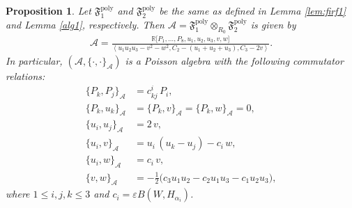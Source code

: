 \documentclass[11pt]{amsart}
\newtheorem{proposition}[theorem]{Proposition}
\theoremstyle{definition}
\theoremstyle{plain}
\theoremstyle{conclusion}
\begin{document}
\begin{proposition}
\label{prop:uniona}
  Let $\mathfrak{F}_1^{\mathrm{poly}}$ and $\mathfrak{F}_2^{\mathrm{poly}}$ be the same as defined in Lemma \ref{lem:firf1} and Lemma \ref{alg1}, respectively. Then $\mathcal{A} = \mathfrak{F}_1^{\mathrm{poly}} \otimes_{R_0} \mathfrak{F}_2^{\mathrm{poly}}$ is given by \begin{align}
    \mathcal{A} =  \frac{\mathbb{R} \bigl[P_1,\ldots,P_8,u_1,u_2,u_3,v,w\bigr]}{\left\langle u_1u_2u_3-v^2-w^2,C_2 - \left(u_1 +  u_2 +  u_3\right) , C_3 - 2 v\right\rangle}     . \label{eq:A1}
\end{align}   In particular, $(\mathcal{A},\{\cdot,\cdot\}_\mathcal{A})$ is a Poisson algebra with the following commutator relations: \begin{align}
\nonumber
\{P_k,P_j\}_{\mathcal{A}} &= c_{kj}^i\,P_i,\\
\nonumber
\{P_k,u_k\}_{\mathcal{A}} &= \{P_k,v\}_{\mathcal{A}}=\{P_k,w\}_{\mathcal{A}}=0,\\
\nonumber
\{u_i,u_j\}_{\mathcal{A}} &= 2\,v  , \label{eq:commure}\\
\{u_i,v\}_{\mathcal{A}} &= u_i\,(u_k-u_j)-c_i\,w ,\\
\nonumber
\{u_i,w\}_{\mathcal{A}} &= c_i\,v  ,\\
\nonumber
\{v,w\}_{\mathcal{A}} &= -\frac{1}{2}\bigl(c_3 u_1u_2-c_2 u_1u_3-c_1 u_2u_3\bigr),
\end{align} where $ 1\leq i,j,k \leq 3$ and $c_i = \varepsilon B(W,H_{\alpha_i})$.
\end{proposition}
\end{document}
